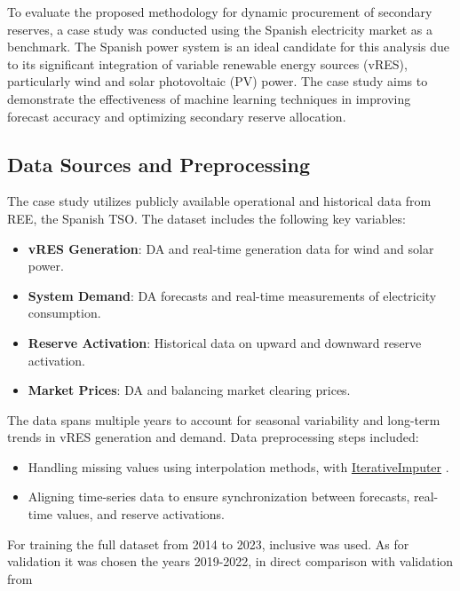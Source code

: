 To evaluate the proposed methodology for dynamic procurement of secondary reserves, a case study was conducted using the Spanish electricity market as a benchmark. The Spanish power system is an ideal candidate for this analysis due to its significant integration of variable renewable energy sources (vRES), particularly wind and solar photovoltaic (PV) power. The case study aims to demonstrate the effectiveness of machine learning techniques in improving forecast accuracy and optimizing secondary reserve allocation.\par
\subsection{Data Sources and Preprocessing}

The case study utilizes publicly available operational and historical data from \gls{REE}, the Spanish \gls{TSO}. The dataset includes the following key variables:
\begin{itemize}
    \item \textbf{vRES Generation}: \gls{DA} and real-time generation data for wind and solar power.
    \item \textbf{System Demand}: \gls{DA} forecasts and real-time measurements of electricity consumption.
    \item \textbf{Reserve Activation}: Historical data on upward and downward reserve activation.
    \item \textbf{Market Prices}: \gls{DA} and balancing market clearing prices.
\end{itemize}


The data spans multiple years to account for seasonal variability and long-term trends in vRES generation and demand. Data preprocessing steps included:
\begin{itemize}
    \item Handling missing values using interpolation methods, with \href{https://scikit-learn.org/stable/modules/generated/sklearn.impute.IterativeImputer.html}{IterativeImputer} \cite{vanBuuren2011}\cite{Buck1960}.
    \item Aligning time-series data to ensure synchronization between forecasts, real-time values, and reserve activations.
\end{itemize}

For training the full dataset from 2014 to 2023, inclusive was used. As for validation it was chosen the years 2019-2022, in direct comparison with validation from \cite{Algarvio2024}

